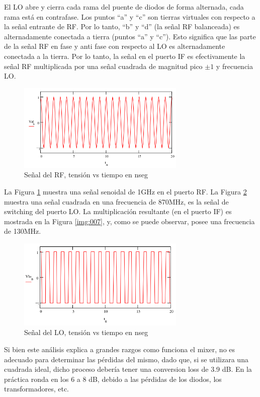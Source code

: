 \documentclass[a4paper,10pt]{article}
\begin{document}
	
	\indent El LO abre y cierra cada rama del puente de diodos de
	forma alternada, cada rama está en contrafase. Los puntos ``a'' y ``c'' son 
	tierras virtuales con respecto a la señal entrante de RF. Por lo tanto, ``b'' 
	y ``d'' (la señal RF balanceada) es alternadamente conectada a tierra (puntos 
	``a'' y ``c''). Esto significa que las parte de la señal RF en fase y anti fase 
	con respecto al LO es alternadamente conectada a la tierra. Por lo tanto, la
	señal en el puerto IF es efectivamente la señal RF multiplicada por una 
	señal cuadrada de magnitud pico $\pm 1$ y frecuencia LO. \\
	
	\begin{figure}[!htb]
		\centering
		\includegraphics[width=8cm]{Images/VRF.png}
		\caption{Señal del RF, tensión vs tiempo en nseg}
		\label{img:005}
	\end{figure}

	\indent La Figura \ref{img:005} muestra una señal senoidal de 1GHz en el
	puerto RF. La Figura \ref{img:006} muestra una señal cuadrada en una 
	frecuencia de 870MHz, es la señal de switching del puerto LO. La 
	multiplicación resultante (en el puerto IF) es mostrada en la Figura 
	\ref{img:007}, y, como se puede observar, posee una frecuencia de 130MHz. \\
	
	\begin{figure}[!htb]
		\centering
		\includegraphics[width=8cm]{Images/VLO.png}
		\caption{Señal del LO, tensión vs tiempo en nseg}
		\label{img:006}
	\end{figure}
	
	\indent Si bien este análisis explica a grandes razgos como funciona el 
	mixer, no es adecuado para determinar las pérdidas del mismo, dado que, si 
	se utilizara una cuadrada ideal, dicho proceso debería tener una conversion
	loss de 3.9 dB. En la práctica ronda en los 6 a 8 dB, debido a las pérdidas
	de los diodos, los transformadores, etc. \\
	
\end{document}
